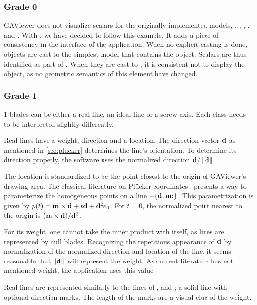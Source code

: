 \subsubsection{Grade 0}
GAViewer does not visualize scalars for the originally implemented models, \ega{}, \pga{}, \cga{}, \cbga{}, and \iga.  With \lga{}, we have decided to follow this example.  It adds a piece of consistency in the interface of the application.  When no explicit casting is done, objects are cast to the simplest model that contains the object.  Scalars are thus identified as part of \ega{}.  When they are cast to \lga{}, it is consistent not to display the object, as no geometric semantics of this element have changed.


\subsubsection{Grade 1}
1-blades can be either a real line, an ideal line or a screw axis.  Each class needs to be interpreted slightly differently.

Real lines have a weight, direction and a location.  The direction vector $\mathbf{d}$ as mentioned in \autoref{sec:plucker} determines the line's orientation.  To determine its direction properly, the software uses the normalized direction $\mathbf{d} / \left\|\mathbf{d}\right\|$.

The location is standardized to be the point closest to the origin of GAViewer's drawing area.  The classical literature on Pl\"ucker coordinates~\cite{Shoemake} presents a way to parameterize the homogeneous points on a line $-\plucker{\V{d}, \V{m}}$.  This parametrization is given by $p(t) = \mathbf{m} \times \mathbf{d} + t \mathbf{d} + \mathbf{d}^2e_0$.  For $t = 0$, the normalized point nearest to the origin is $(\mathbf{m} \times \mathbf{d}) / \mathbf{d}^2$.

For its weight, one cannot take the inner product with itself, as lines are represented by null blades.  Recognizing the repetitious appearance of $\mathbf{d}$ by normalization of the normalized direction and location of the line, it seems reasonable that $\left\|\mathbf{d}\right\|$ will represent the weight.  As current literature has not mentioned weight, the application uses this value.

Real lines are represented similarly to the lines of \pga{}, \cga{} and \cbga{}; a solid line with optional direction marks.  The length of the marks are a visual clue of the weight.

